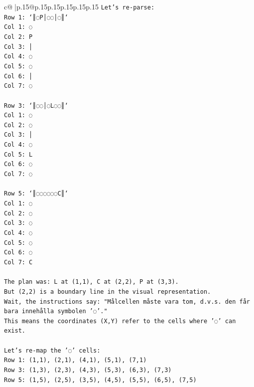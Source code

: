 \documentclass{article}
\begin{document}
{\begin{supertabular}{c@{$\;$}|p{.15\linewidth}@{}p{.15\linewidth}p{.15\linewidth}p{.15\linewidth}p{.15\linewidth}p{.15\linewidth}}
{{{\texttt{Let's re{-}parse:} \\
\texttt{Row 1: `║◌P│◌◌│◌║`} \\
\texttt{Col 1: ◌} \\
\texttt{Col 2: P} \\
\texttt{Col 3: │} \\
\texttt{Col 4: ◌} \\
\texttt{Col 5: ◌} \\
\texttt{Col 6: │} \\
\texttt{Col 7: ◌} \\
\\ 
\texttt{Row 3: `║◌◌│◌L◌◌║`} \\
\texttt{Col 1: ◌} \\
\texttt{Col 2: ◌} \\
\texttt{Col 3: │} \\
\texttt{Col 4: ◌} \\
\texttt{Col 5: L} \\
\texttt{Col 6: ◌} \\
\texttt{Col 7: ◌} \\
\\ 
\texttt{Row 5: `║◌◌◌◌◌◌C║`} \\
\texttt{Col 1: ◌} \\
\texttt{Col 2: ◌} \\
\texttt{Col 3: ◌} \\
\texttt{Col 4: ◌} \\
\texttt{Col 5: ◌} \\
\texttt{Col 6: ◌} \\
\texttt{Col 7: C} \\
\\ 
\texttt{The plan was: L at (1,1), C at (2,2), P at (3,3).} \\
\texttt{But (2,2) is a boundary line in the visual representation.} \\
\texttt{Wait, the instructions say: "Målcellen måste vara tom, d.v.s. den får bara innehålla symbolen '◌'."} \\
\texttt{This means the coordinates (X,Y) refer to the cells where '◌' can exist.} \\
\\ 
\texttt{Let's re{-}map the '◌' cells:} \\
\texttt{Row 1: (1,1), (2,1), (4,1), (5,1), (7,1)} \\
\texttt{Row 3: (1,3), (2,3), (4,3), (5,3), (6,3), (7,3)} \\
\texttt{Row 5: (1,5), (2,5), (3,5), (4,5), (5,5), (6,5), (7,5)} \\
}}}
\end{supertabular}}
\end{document}
